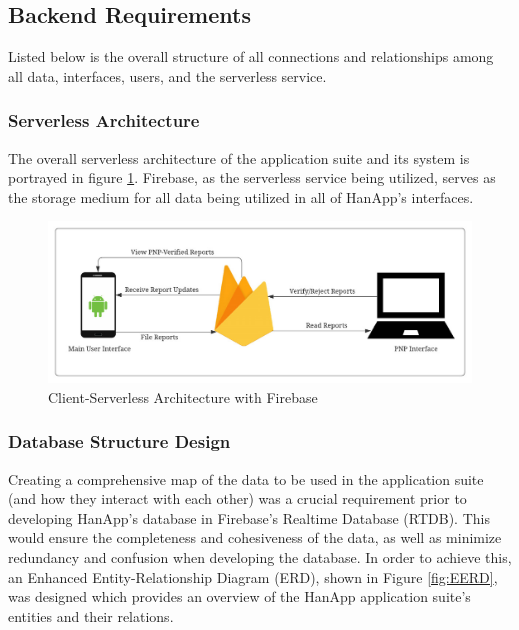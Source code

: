 \subsection{Backend Requirements}

Listed below is the overall structure of all connections and relationships among all data, interfaces, users, and the serverless service. 

\subsubsection{Serverless Architecture}
The overall serverless architecture of the application suite and its system is portrayed in figure \ref{fig:ServerlessFirebase}. Firebase, as the serverless service being utilized, serves as the storage medium for all data being utilized in all of HanApp’s interfaces. 

\begin{figure}[!h]
    \centering
    \includegraphics[width=\textwidth]{figures/Chapter3/Chapt3_ServerlessArchitecture.jpeg}
    \caption{Client-Serverless Architecture with Firebase}
    \label{fig:ServerlessFirebase}
\end{figure}

\subsubsection{Database Structure Design}
Creating a comprehensive map of the data to be used in the application suite (and how they interact with each other) was a crucial requirement prior to developing HanApp's database in Firebase's Realtime Database (RTDB). This would ensure the completeness and cohesiveness of the data, as well as minimize redundancy and confusion when developing the database. In order to achieve this, an Enhanced Entity-Relationship Diagram (ERD), shown in Figure \ref{fig:EERD}, was designed which provides an overview of the HanApp application suite's entities and their relations.

